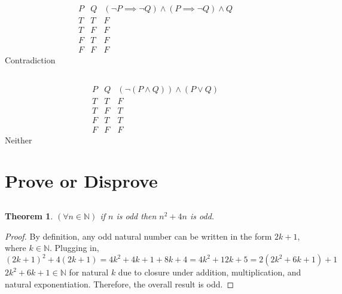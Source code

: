 \documentclass{article}
\newtheorem{theorem}{Theorem}
\newcommand{\N}{\mathbb{N}}
\begin{document}
\subsection{}

\begin{equation}
    \begin{array}{c|c|c}
        P & Q & (\lnot P \implies \lnot Q) \land (P \implies \lnot Q) \land Q \\
        \hline
        T & T & F \\
        T & F & F \\
        F & T & F \\
        F & F & F
    \end{array}
\end{equation}
Contradiction

\subsection{}

\begin{equation}
    \begin{array}{c|c|c}
        P & Q & (\lnot (P \land Q)) \land (P \lor Q) \\
        \hline
        T & T & F \\
        T & F & T \\
        F & T & T \\
        F & F & F
    \end{array}
\end{equation}
Neither

\section{Prove or Disprove}

\subsection{}

\begin{theorem}
    \((\forall n \in \N)\) if \(n\) is odd then \(n^2 + 4n\) is odd.
\end{theorem}
\begin{proof}
    By definition, any odd natural number can be written in the form \(2k + 1\), where \(k \in \N\).
    Plugging in,
    \begin{equation}
        (2k + 1)^2 + 4(2k + 1) = 4k^2 + 4k + 1 + 8k + 4 = 4k^2 + 12k + 5 = 2(2k^2 + 6k + 1) + 1
    \end{equation}
    \(2k^2 + 6k + 1 \in \N\) for natural \(k\) due to closure under addition, multiplication, and natural exponentiation.
    Therefore, the overall result is odd.
\end{proof}
\end{document}
